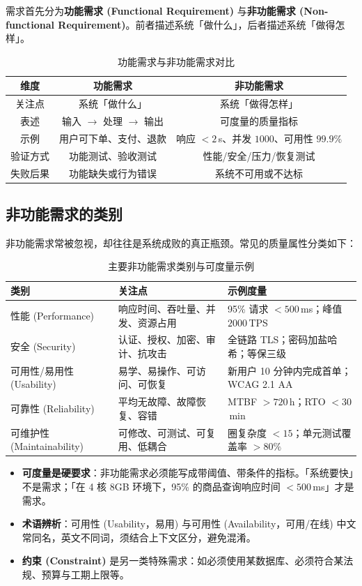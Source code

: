 需求首先分为\textbf{功能需求 (Functional Requirement)} 与\textbf{非功能需求 (Non-functional Requirement)}。前者描述系统「做什么」，后者描述系统「做得怎样」。

\begin{table}[H]
\centering
\caption{功能需求与非功能需求对比}
\begin{tabulary}{\textwidth}{CCC}
\toprule
维度 & 功能需求 & 非功能需求 \\
\midrule
关注点 & 系统「做什么」 & 系统「做得怎样」 \\
表述 & 输入 $\to$ 处理 $\to$ 输出 & 可度量的质量指标 \\
示例 & 用户可下单、支付、退款 & 响应 $< 2$\,s、并发 $1000$、可用性 $99.9\%$ \\
验证方式 & 功能测试、验收测试 & 性能/安全/压力/恢复测试 \\
失败后果 & 功能缺失或行为错误 & 系统不可用或不达标 \\
\bottomrule
\end{tabulary}
\end{table}

\subsection{非功能需求的类别}

非功能需求常被忽视，却往往是系统成败的真正瓶颈。常见的质量属性分类如下：

\begin{table}[H]
\centering
\caption{主要非功能需求类别与可度量示例}
\begin{tabulary}{\textwidth}{LLL}
\toprule
类别 & 关注点 & 示例度量 \\
\midrule
性能 (Performance) & 响应时间、吞吐量、并发、资源占用 & 95\% 请求 $< 500$\,ms；峰值 $2000$\,TPS \\
安全 (Security) & 认证、授权、加密、审计、抗攻击 & 全链路 TLS；密码加盐哈希；等保三级 \\
可用性/易用性 (Usability) & 易学、易操作、可访问、可恢复 & 新用户 10 分钟内完成首单；WCAG 2.1 AA \\
可靠性 (Reliability) & 平均无故障、故障恢复、容错 & MTBF $> 720$\,h；RTO $< 30$\,min \\
可维护性 (Maintainability) & 可修改、可测试、可复用、低耦合 & 圈复杂度 $< 15$；单元测试覆盖率 $> 80\%$ \\
\bottomrule
\end{tabulary}
\end{table}

\begin{itemize}
    \item \textbf{可度量是硬要求}：非功能需求必须能写成带阈值、带条件的指标。「系统要快」不是需求；「在 4 核 8GB 环境下，95\% 的商品查询响应时间 $< 500$\,ms」才是需求。
    \item \textbf{术语辨析}：可用性 (Usability，易用) 与可用性 (Availability，可用/在线) 中文常同名，英文不同词，须结合上下文区分，避免混淆。
    \item \textbf{约束 (Constraint)} 是另一类特殊需求：如必须使用某数据库、必须符合某法规、预算与工期上限等。
\end{itemize}

